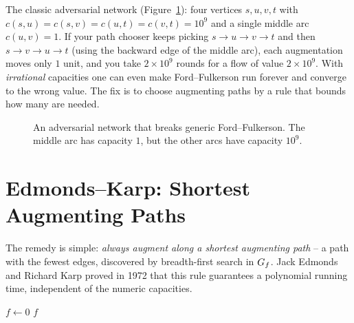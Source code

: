 \begin{trapbox}
The classic adversarial network (Figure~\ref{ch12:fig-trap-network}): four vertices $s,u,v,t$ with $c(s,u)=c(s,v)=
c(u,t)=c(v,t)=10^9$ and a single middle arc $c(u,v)=1$. If your path chooser keeps
picking $s\to u\to v\to t$ and then $s\to v\to u\to t$ (using the backward edge of
the middle arc), each augmentation moves only $1$ unit, and you take $2\times
10^9$ rounds for a flow of value $2\times 10^9$. With \emph{irrational} capacities
one can even make Ford--Fulkerson run forever and converge to the wrong value. The
fix is to choose augmenting paths by a rule that bounds how many are needed.
\end{trapbox}

\begin{figure}[H]
\centering
{}
\caption{An adversarial network that breaks generic Ford--Fulkerson. The middle arc has capacity $1$, but the other arcs have capacity $10^9$.}
\label{ch12:fig-trap-network}
\end{figure}

\section{Edmonds--Karp: Shortest Augmenting Paths}
\label{ch12:ek}

The remedy is simple: \emph{always augment along a shortest
augmenting path} -- a path with the fewest edges, discovered by breadth-first
search in $G_f$. Jack Edmonds and Richard Karp proved in 1972 that this rule
guarantees a polynomial running time, independent of the numeric capacities.

\begin{algorithm}[H]
\caption{\textsc{Edmonds--Karp}}
\label{ch12:alg-ek}
$f\gets 0$\;
\Return $f$\;
\end{algorithm}

